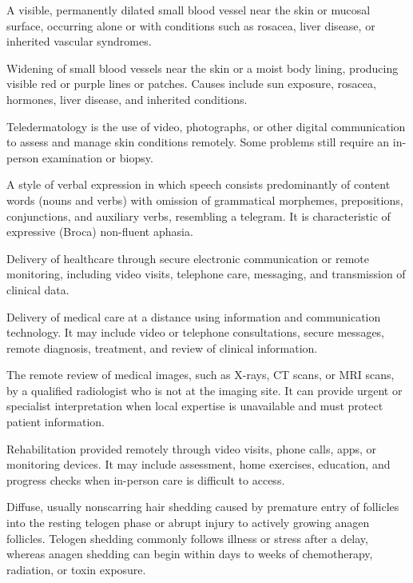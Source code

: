  A visible, permanently dilated small blood vessel near the skin or mucosal surface, occurring alone or with conditions such as rosacea, liver disease, or inherited vascular syndromes.

 Widening of small blood vessels near the skin or a moist body lining, producing visible red or purple lines or patches. Causes include sun exposure, rosacea, hormones, liver disease, and inherited conditions.

 Teledermatology is the use of video, photographs, or other digital communication to assess and manage skin conditions remotely. Some problems still require an in-person examination or biopsy.

 A style of verbal expression in which speech consists predominantly of content words (nouns and verbs) with omission of grammatical morphemes, prepositions, conjunctions, and auxiliary verbs, resembling a telegram. It is characteristic of expressive (Broca) non-fluent aphasia.

 Delivery of healthcare through secure electronic communication or remote monitoring, including video visits, telephone care, messaging, and transmission of clinical data.

 Delivery of medical care at a distance using information and communication technology. It may include video or telephone consultations, secure messages, remote diagnosis, treatment, and review of clinical information.

 The remote review of medical images, such as X-rays, CT scans, or MRI scans, by a qualified radiologist who is not at the imaging site. It can provide urgent or specialist interpretation when local expertise is unavailable and must protect patient information.

 Rehabilitation provided remotely through video visits, phone calls, apps, or monitoring devices. It may include assessment, home exercises, education, and progress checks when in-person care is difficult to access.

 Diffuse, usually nonscarring hair shedding caused by premature entry of follicles into the resting telogen phase or abrupt injury to actively growing anagen follicles. Telogen shedding commonly follows illness or stress after a delay, whereas anagen shedding can begin within days to weeks of chemotherapy, radiation, or toxin exposure.

